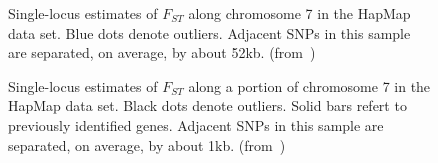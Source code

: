 \begin{figure}
\begin{center}
\end{center}
\caption{Single-locus estimates of $F_{ST}$ along chromosome 7 in the
  HapMap data set. Blue dots denote outliers. Adjacent SNPs in this
  sample are separated, on average, by about
  52kb. (from~\cite{Guo-etal-2009})}\label{fig:low-res-SNP}
\end{figure}

\begin{figure}
\begin{center}
\end{center}
\caption{Single-locus estimates of $F_{ST}$ along a portion of
  chromosome 7 in the HapMap data set. Black dots denote
  outliers. Solid bars refert to previously identified genes. Adjacent
  SNPs in this sample are separated, on average, by about
  1kb. (from~\cite{Guo-etal-2009})}\label{fig:high-res-SNP}
\end{figure}

